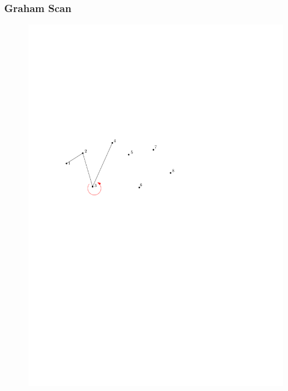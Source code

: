 \begin{frame}
	\frametitle{{Graham Scan}}
\begin{figure}[htbp]
	\begin{center}
  	\includegraphics[width=.8\linewidth]{bilder/graham3}
	\end{center}
\end{figure}
\end{frame}


